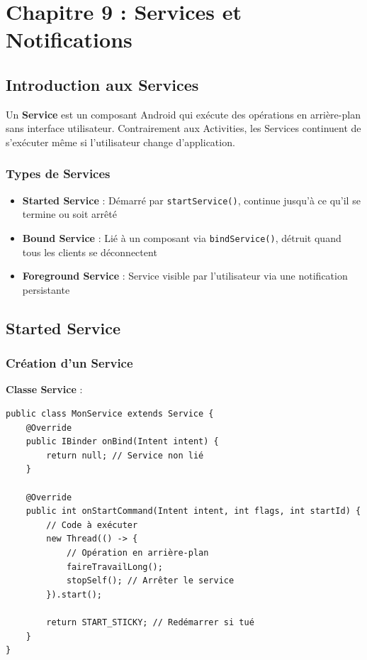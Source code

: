 \documentclass[11pt,a4paper]{article}
\begin{document}

\section{Chapitre 9 : Services et Notifications}

\subsection{Introduction aux Services}

Un \textbf{Service} est un composant Android qui exécute des opérations en arrière-plan sans interface utilisateur. Contrairement aux Activities, les Services continuent de s'exécuter même si l'utilisateur change d'application.

\subsubsection{Types de Services}

\begin{itemize}
    \item \textbf{Started Service} : Démarré par \texttt{startService()}, continue jusqu'à ce qu'il se termine ou soit arrêté
    \item \textbf{Bound Service} : Lié à un composant via \texttt{bindService()}, détruit quand tous les clients se déconnectent
    \item \textbf{Foreground Service} : Service visible par l'utilisateur via une notification persistante
\end{itemize}

\subsection{Started Service}

\subsubsection{Création d'un Service}

\textbf{Classe Service} :
\begin{lstlisting}
public class MonService extends Service {
    @Override
    public IBinder onBind(Intent intent) {
        return null; // Service non lié
    }
    
    @Override
    public int onStartCommand(Intent intent, int flags, int startId) {
        // Code à exécuter
        new Thread(() -> {
            // Opération en arrière-plan
            faireTravailLong();
            stopSelf(); // Arrêter le service
        }).start();
        
        return START_STICKY; // Redémarrer si tué
    }
}
\end{lstlisting}
\end{document}
